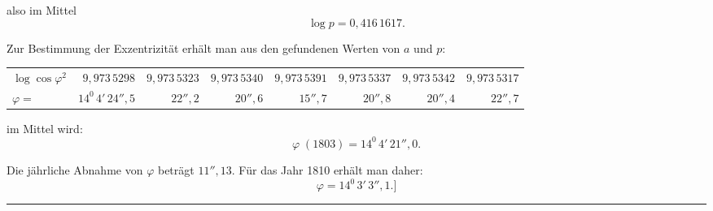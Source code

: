 \begin{landscape}
\[\]
\par\noindent also im Mittel
\[
\log p=0{,}416\,1617.
\]
\par\noindent Zur Bestimmung der Exzentrizität erhält man aus den gefundenen Werten von \(a\) und \(p\):
\begingroup
\small\setlength{\tabcolsep}{5pt}\renewcommand{\arraystretch}{1.18}
\begin{center}
\begin{tabular}{@{}lrrrrrrr@{}}
\(\log\cos\varphi^2\)&\(9{,}973\,5298\)&\(9{,}973\,5323\)&\(9{,}973\,5340\)&\(9{,}973\,5391\)&\(9{,}973\,5337\)&\(9{,}973\,5342\)&\(9{,}973\,5317\)\\
\(\varphi=\)&\(14^0\,4'\,24''{,}5\)&\(22''{,}2\)&\(20''{,}6\)&\(15''{,}7\)&\(20''{,}8\)&\(20''{,}4\)&\(22''{,}7\)
\end{tabular}
\end{center}
\endgroup
\par\noindent im Mittel wird:
\[
\varphi\;(1803)=14^0\,4'\,21''{,}0.
\]
\par\noindent Die jährliche Abnahme von \(\varphi\) beträgt \(11''{,}13\). Für das Jahr 1810 erhält man daher:
\[
\varphi=14^0\,3'\,3''{,}1.]
\]
\begin{center}\rule{.24\linewidth}{.4pt}\end{center}
\clearpage
\endgroup
\end{landscape}
